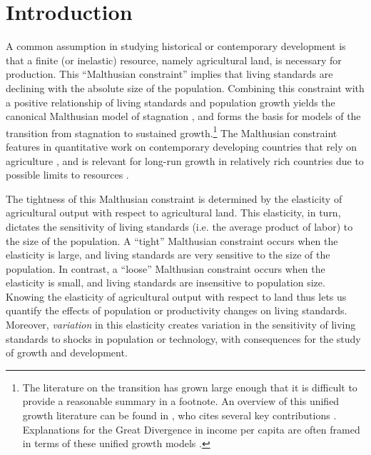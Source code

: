 \documentclass[11pt]{article}
\begin{document}
\pagebreak 

\section{Introduction}
\onehalfspacing 
A common assumption in studying historical or contemporary development is that a finite (or inelastic) resource, namely agricultural land, is necessary for production. This ``Malthusian constraint'' implies that living standards are declining with the absolute size of the population. Combining this constraint with a positive relationship of living standards and population growth yields the canonical Malthusian model of stagnation \citep{ashraf2010dynamics}, and forms the basis for models of the transition from stagnation to sustained growth.\footnote{The literature on the transition has grown large enough that it is difficult to provide a reasonable summary in a footnote. An overview of this unified growth literature can be found in \citet{Galor:2011uq}, who cites several key contributions \citep{gw00,galor2002natural,Hansen:2002fk,doepke2004accounting,cs2005,lagerlof2006,craftsmills2009,strulik2008population}. Explanations for the Great Divergence in income per capita are often framed in terms of these unified growth models \citep{kp2001,galor2008trading,vollrath2011,vv08,vv13,cs2015}.} The Malthusian constraint features in quantitative work on contemporary developing countries that rely on agriculture \citep{Gollin:2007oq,Restuccia:2008hc,weilwilde2009,Gollin:2010ys,ev2016clim}, and is relevant for long-run growth in relatively rich countries due to possible limits to resources \citep{perettovalente2015}.

The tightness of this Malthusian constraint is determined by the elasticity of agricultural output with respect to agricultural land. This elasticity, in turn, dictates the sensitivity of living standards (i.e. the average product of labor) to the size of the population. A ``tight'' Malthusian constraint occurs when the elasticity is large, and living standards are very sensitive to the size of the population. In contrast, a ``loose'' Malthusian constraint occurs when the elasticity is small, and living standards are insensitive to population size. Knowing the elasticity of agricultural output with respect to land thus lets us quantify the effects of population or productivity changes on living standards. Moreover, \textit{variation} in this elasticity creates variation in the sensitivity of living standards to shocks in population or technology, with consequences for the study of growth and development.
\end{document}

